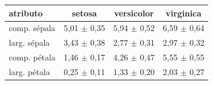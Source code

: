 
\begin{tabular}{lccc}
\toprule
\textbf{atributo} & \textbf{setosa} & \textbf{versicolor} & \textbf{virginica} \\
\midrule
comp. sépala & 5{,}01 $\pm$ 0{,}35 & 5{,}94 $\pm$ 0{,}52 & 6{,}59 $\pm$ 0{,}64 \\
larg. sépala & 3{,}43 $\pm$ 0{,}38 & 2{,}77 $\pm$ 0{,}31 & 2{,}97 $\pm$ 0{,}32 \\
comp. pétala & 1{,}46 $\pm$ 0{,}17 & 4{,}26 $\pm$ 0{,}47 & 5{,}55 $\pm$ 0{,}55 \\
larg. pétala & 0{,}25 $\pm$ 0{,}11 & 1{,}33 $\pm$ 0{,}20 & 2{,}03 $\pm$ 0{,}27 \\
\bottomrule
\end{tabular}

